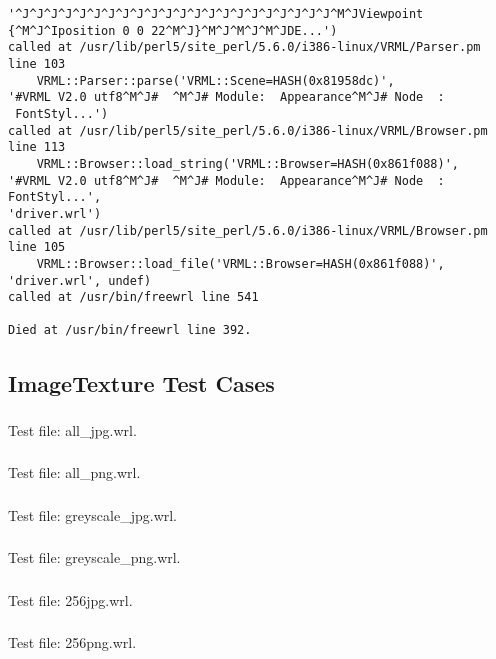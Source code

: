 \begin{verbatim}
'^J^J^J^J^J^J^J^J^J^J^J^J^J^J^J^J^J^J^J^J^J^J^M^JViewpoint
{^M^J^Iposition 0 0 22^M^J}^M^J^M^J^M^JDE...')
called at /usr/lib/perl5/site_perl/5.6.0/i386-linux/VRML/Parser.pm
line 103
	VRML::Parser::parse('VRML::Scene=HASH(0x81958dc)',
'#VRML V2.0 utf8^M^J#  ^M^J# Module:  Appearance^M^J# Node  :
 FontStyl...')
called at /usr/lib/perl5/site_perl/5.6.0/i386-linux/VRML/Browser.pm
line 113
	VRML::Browser::load_string('VRML::Browser=HASH(0x861f088)',
'#VRML V2.0 utf8^M^J#  ^M^J# Module:  Appearance^M^J# Node  : 
FontStyl...',
'driver.wrl')
called at /usr/lib/perl5/site_perl/5.6.0/i386-linux/VRML/Browser.pm
line 105
	VRML::Browser::load_file('VRML::Browser=HASH(0x861f088)',
'driver.wrl', undef)
called at /usr/bin/freewrl line 541

Died at /usr/bin/freewrl line 392.

\end{verbatim}

\subsection{ImageTexture Test Cases}

\subsubsection{\ITA}
\label{sec:jpeg-rgb}
Test file: all\_jpg.wrl.

\subsubsection{\ITB}
Test file: all\_png.wrl.

\subsubsection{\ITC}
Test file: greyscale\_jpg.wrl.

\subsubsection{\ITD}
Test file: greyscale\_png.wrl.

\subsubsection{\ITE}
Test file: 256jpg.wrl.

\subsubsection{\ITF}
Test file: 256png.wrl.

